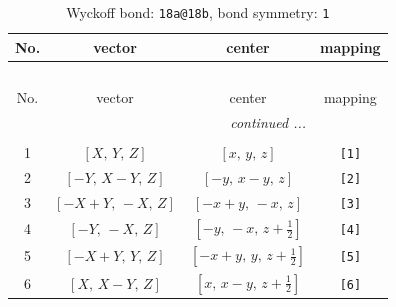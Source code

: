 \documentclass[fleqn,8pt]{jsarticle}
\begin{document}
\begin{longtable}{cccc}
\caption{Wyckoff bond: {\tt 18a@18b}, bond symmetry: {\tt 1}}
 \\
 \hline \hline
No. & vector & center & mapping \\ \hline \endfirsthead

\multicolumn{3}{l}{\tablename\ \thetable{}} \\
 \hline \hline
No. & vector & center & mapping \\ \hline \endhead

 \hline \hline
\multicolumn{3}{r}{\footnotesize\it continued ...} \\ \endfoot

 \hline \hline
\multicolumn{3}{r}{} \\ \endlastfoot

1 & $\left[ X,\, Y,\, Z \right]$ & $\left[ x,\, y,\, z \right]$ & {\tt [1]} \\ \hline
2 & $\left[ - Y,\, X - Y,\, Z \right]$ & $\left[ - y,\, x - y,\, z \right]$ & {\tt [2]} \\ \hline
3 & $\left[ - X + Y,\, - X,\, Z \right]$ & $\left[ - x + y,\, - x,\, z \right]$ & {\tt [3]} \\ \hline
4 & $\left[ - Y,\, - X,\, Z \right]$ & $\left[ - y,\, - x,\, z + \frac{1}{2} \right]$ & {\tt [4]} \\ \hline
5 & $\left[ - X + Y,\, Y,\, Z \right]$ & $\left[ - x + y,\, y,\, z + \frac{1}{2} \right]$ & {\tt [5]} \\ \hline
6 & $\left[ X,\, X - Y,\, Z \right]$ & $\left[ x,\, x - y,\, z + \frac{1}{2} \right]$ & {\tt [6]} \\
\end{longtable}
\end{document}
